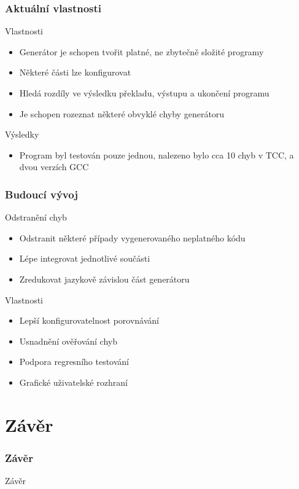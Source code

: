 \documentclass{beamer}
\begin{document}
\frame
{
  \frametitle{Aktuální vlastnosti}
  \begin{block}{Vlastnosti}
    \begin{itemize}
      \item Generátor je schopen tvořit platné, ne zbytečně složité programy
      \item Některé části lze konfigurovat
      \item Hledá rozdíly ve výsledku překladu, výstupu a ukončení programu
      \item Je schopen rozeznat některé obvyklé chyby generátoru
    \end{itemize}
  \end{block}

  \begin{block}{Výsledky}
  \begin{itemize}
    \item Program byl testován pouze jednou, nalezeno bylo cca 10 chyb v TCC, a dvou verzích GCC
  \end{itemize}
  \end{block}
}

\frame
{
  \frametitle{Budoucí vývoj}
  \begin{block}{Odstranění chyb}
    \begin{itemize}
    \item Odstranit některé případy vygenerovaného neplatného kódu
    \item Lépe integrovat jednotlivé součásti
    \item Zredukovat jazykově závislou část generátoru
    \end{itemize}
  \end{block}
  \begin{block}{Vlastnosti}
  \begin{itemize}
  \item Lepší konfigurovatelnost porovnávání
  \item Usnadnění ověřování chyb
  \item Podpora regresního testování
  \item Grafické uživatelské rozhraní
  \end{itemize}
  \end{block}
}

\section{Závěr}
\frame
{
  \frametitle{Závěr}
  \begin{block}{Závěr}
  \end{block}
}
\end{document}
